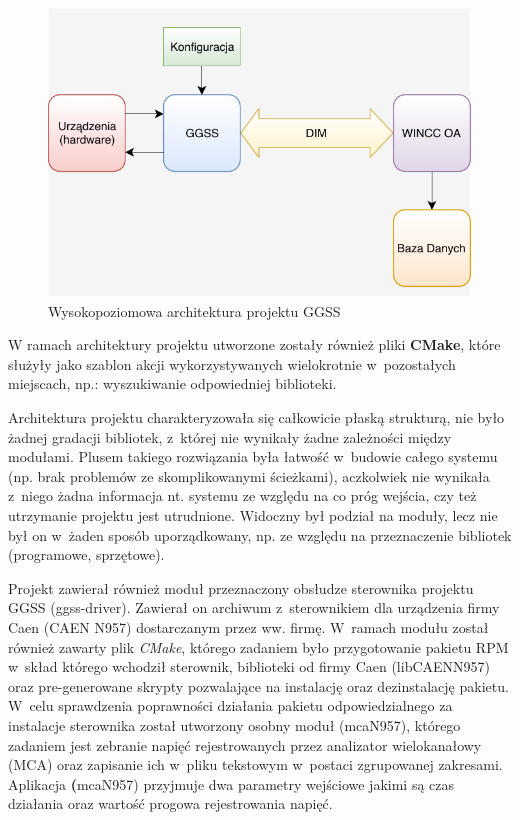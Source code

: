 \begin{figure}[H]
\centering
\includegraphics[width=\textwidth]{res/highLevelArch}
\caption{Wysokopoziomowa architektura projektu GGSS}
\label{fig:highLevelArch}
\end{figure}

W ramach architektury projektu utworzone zostały również pliki \textbf{CMake}, które służyły jako szablon akcji wykorzystywanych wielokrotnie w~pozostałych miejscach, np.: wyszukiwanie odpowiedniej biblioteki.\par 
Architektura projektu charakteryzowała się całkowicie płaską strukturą, nie było żadnej gradacji bibliotek, z~której nie wynikały żadne zależności między modułami. Plusem takiego rozwiązania była łatwość w~budowie całego systemu (np. brak problemów ze skomplikowanymi ścieżkami), aczkolwiek nie wynikała z~niego żadna informacja nt. systemu ze względu na co próg wejścia, czy też utrzymanie projektu jest utrudnione. Widoczny był podział na moduły, lecz nie był on w~żaden sposób uporządkowany, np. ze względu na przeznaczenie bibliotek (programowe, sprzętowe). 

\par Projekt zawierał również moduł przeznaczony obsłudze sterownika projektu GGSS (ggss-driver). Zawierał on archiwum z~sterownikiem dla urządzenia firmy Caen (CAEN N957) dostarczanym przez ww. firmę. W~ramach modułu został również zawarty plik \textit{CMake}, którego zadaniem było przygotowanie pakietu RPM w~skład którego wchodził sterownik, biblioteki od firmy Caen (libCAENN957) oraz pre-generowane skrypty pozwalające na instalację oraz dezinstalację pakietu. W~celu sprawdzenia poprawności działania pakietu odpowiedzialnego za instalacje sterownika został utworzony osobny moduł (mcaN957), którego zadaniem jest zebranie napięć rejestrowanych przez analizator wielokanałowy (MCA) oraz zapisanie ich w~pliku tekstowym w~postaci zgrupowanej zakresami. Aplikacja \textbf(mcaN957) przyjmuje dwa parametry wejściowe jakimi są czas działania oraz wartość progowa rejestrowania napięć.


